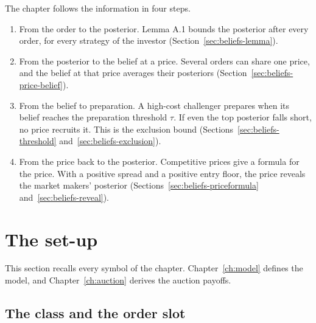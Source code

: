 The chapter follows the information in four steps.
\begin{enumerate}
\item From the order to the posterior. Lemma A.1 bounds the posterior after every order, for every strategy of the investor (Section~\ref{sec:beliefs-lemma}).
\item From the posterior to the belief at a price. Several orders can share one price, and the belief at that price averages their posteriors (Section~\ref{sec:beliefs-price-belief}).
\item From the belief to preparation. A high-cost challenger prepares when its belief reaches the preparation threshold \(\tau\). If even the top posterior falls short, no price recruits it. This is the exclusion bound (Sections~\ref{sec:beliefs-threshold} and~\ref{sec:beliefs-exclusion}).
\item From the price back to the posterior. Competitive prices give a formula for the price. With a positive spread and a positive entry floor, the price reveals the market makers' posterior (Sections~\ref{sec:beliefs-priceformula} and~\ref{sec:beliefs-reveal}).
\end{enumerate}

\section{The set-up}\label{sec:beliefs-setup}

This section recalls every symbol of the chapter. Chapter~\ref{ch:model} defines the model, and Chapter~\ref{ch:auction} derives the auction payoffs.

\subsection{The class and the order slot}


